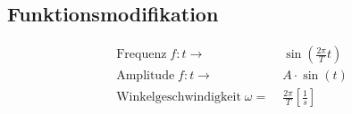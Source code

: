 \subsection{Funktionsmodifikation}
\vspace*{-1em}
    \begin{align*}
        \text{Frequenz} \; f: t \rightarrow& \; \sin(\frac{2 \pi}{T} t)\\
        \text{Amplitude} \; f: t \rightarrow& \; A \cdot \sin(t)\\
        \text{Winkelgeschwindigkeit} \; \omega =& \; \frac{2 \pi}{T} \left[\frac{1}{s}\right]
    \end{align*}